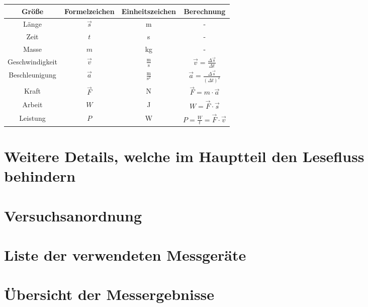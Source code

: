 \begin{table}[hbt]	
	\centering
	\renewcommand{\arraystretch}{1.5}	%
	\label{tab:physikalGroessen}
	\begin{tabular}{c|ccc}
		\parbox[t]{0.17\linewidth}{\centering Größe} & \parbox[t]{0.17\linewidth}{\centering Formelzeichen} & \parbox[t]{0.17\linewidth}{\centering Einheitszeichen}  & \parbox[t]{0.17\linewidth}{\centering Berechnung} \\ 
		\hline 
		\hline
		Länge & $ \vec{s} $ & m & - \\
		Zeit & $ t $  & s & - \\
		Masse & $ m $ & kg & - \\
		Geschwindigkeit & $ \vec{v} $ &  $ \frac{\mathrm{m}}{\mathrm{s}} $ & $ \vec{v} = \frac{\Delta \vec{s}}{\Delta t} $ \\
		Beschleunigung & $ \vec{a} $ & $ \frac{\mathrm{m}}{\mathrm{s}^{2}} $ & $ \vec{a} = \frac{\Delta \vec{s}}{(\Delta t)^{2}} $ \\
		Kraft & $ \vec{F} $ & N & $ \vec{F} = m \cdot \vec{a} $ \\
		Arbeit & $ W $ & J & $ W = \vec{F} \cdot \vec{s} $ \\
		Leistung & $ P $ & W & $ P = \frac{W}{t} = \vec{F} \cdot \vec{v} $ \\
	\end{tabular} 
\end{table}

\section{Weitere Details, welche im Hauptteil den Lesefluss behindern}

\setcounter{chapter}{2}
\setcounter{section}{0}
\setcounter{table}{0}
\setcounter{figure}{0}

\section{Versuchsanordnung}

\section{Liste der verwendeten Messgeräte}

\section{Übersicht der Messergebnisse}

